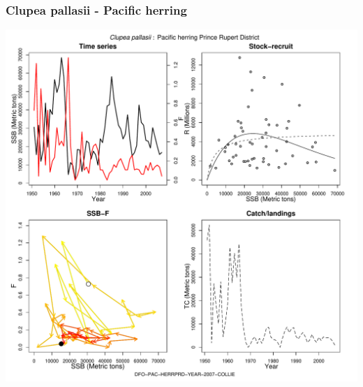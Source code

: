 \subsubsection{Clupea pallasii - Pacific herring}
\begin{center}
\includegraphics[width=1.2\textwidth]{../R/figures/DFO-PAC-HERRPRD-YEAR-2007-COLLIE.pdf}
\end{center}

